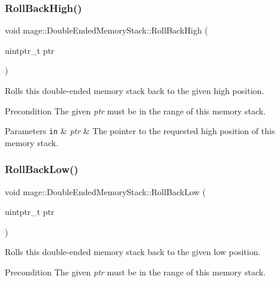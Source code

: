 \subsubsection{\texorpdfstring{Roll\+Back\+High()}{RollBackHigh()}}
{\footnotesize\ttfamily void mage\+::\+Double\+Ended\+Memory\+Stack\+::\+Roll\+Back\+High (\begin{DoxyParamCaption}\item[{uintptr\+\_\+t}]{ptr }\end{DoxyParamCaption})\hspace{0.3cm}{\ttfamily [noexcept]}}

Rolls this double-\/ended memory stack back to the given high position.

\begin{DoxyPrecond}{Precondition}
The given {\itshape ptr} must be in the range of this memory stack. 
\end{DoxyPrecond}

\begin{DoxyParams}[1]{Parameters}
\mbox{\tt in}  & {\em ptr} & The pointer to the requested high position of this memory stack. \\
\hline
\end{DoxyParams}
\mbox{\label{classmage_1_1_double_ended_memory_stack_ad9d2e796dea54978d1909faf329f839b}} 
\subsubsection{\texorpdfstring{Roll\+Back\+Low()}{RollBackLow()}}
{\footnotesize\ttfamily void mage\+::\+Double\+Ended\+Memory\+Stack\+::\+Roll\+Back\+Low (\begin{DoxyParamCaption}\item[{uintptr\+\_\+t}]{ptr }\end{DoxyParamCaption})\hspace{0.3cm}{\ttfamily [noexcept]}}

Rolls this double-\/ended memory stack back to the given low position.

\begin{DoxyPrecond}{Precondition}
The given {\itshape ptr} must be in the range of this memory stack. 
\end{DoxyPrecond}

